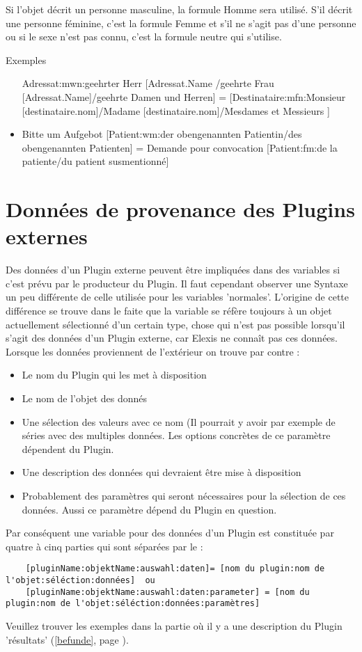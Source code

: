 Si l'objet décrit un personne masculine, la formule Homme sera utilisé. S'il décrit une personne féminine, c'est la formule Femme et s'il ne s'agit pas d'une personne ou si le sexe n'est pas connu, c'est la formule neutre qui s'utilise. 

\medskip

Exemples
\begin{itemize}
    \item [Adressat:mwn:geehrter Herr [Adressat.Name]/geehrte Frau [Adressat.Name]/geehrte Damen und Herren]
    = [Destinataire:mfn:Monsieur [destinataire.nom]/Madame [destinataire.nom]/Mesdames et Messieurs ]
    \item Bitte um Aufgebot [Patient:wm:der obengenannten Patientin/des obengenannten Patienten]
   =  Demande pour convocation [Patient:fm:de la patiente/du patient susmentionné]
\end{itemize}

\section{Données de provenance des Plugins externes}
\label{datenfelder_extern}
Des données d'un Plugin externe peuvent être impliquées dans des variables si c'est prévu par le producteur du Plugin. Il faut cependant observer une Syntaxe un peu différente de celle utilisée pour les variables 'normales'. L'origine de cette différence se trouve dans le faite que la variable se réfère toujours à un objet actuellement sélectionné d'un certain type, chose qui n'est pas possible lorsqu'il s'agit des données d'un Plugin externe, car Elexis ne connaît pas ces données.
Lorsque les données proviennent de l'extérieur on trouve par contre :
\begin{itemize}
\item Le nom du Plugin qui les met à disposition
\item Le nom de l'objet des donnés
\item Une sélection des valeurs avec ce nom (Il pourrait y avoir par exemple de séries avec des multiples données. Les options concrètes de ce paramètre dépendent du Plugin.
\item Une description des données qui devraient être mise à disposition
\item Probablement des paramètres qui seront nécessaires pour la sélection de ces données. Aussi ce paramètre dépend du Plugin en question.
\end{itemize}
Par conséquent une variable pour des données d'un Plugin est constituée par quatre à cinq parties qui sont séparées par le :
\begin{verbatim}
    [pluginName:objektName:auswahl:daten]= [nom du plugin:nom de l'objet:séléction:données]  ou
    [pluginName:objektName:auswahl:daten:parameter] = [nom du plugin:nom de l'objet:séléction:données:paramètres]
\end{verbatim}

\medskip

Veuillez trouver les exemples dans la partie où il y a une description du Plugin 'résultats'   (\ref{befunde}, page \pageref{befunde}).
